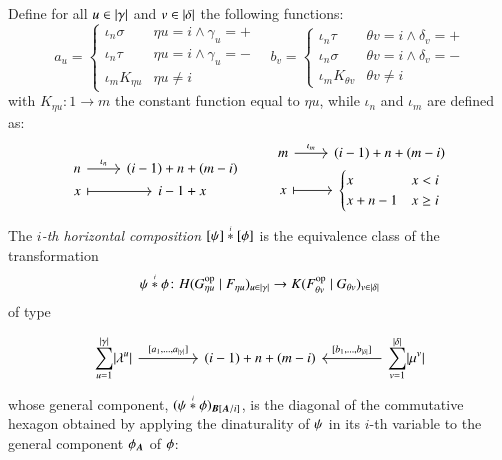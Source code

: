 \begin{definition}
\[	\]
    Define for all $u \in\lvert \gamma \rvert$ and $v\in\lvert \delta \rvert$ the following functions:
    \[
    a_u = \begin{cases}
    \iota_n \sigma & \eta u = i \land \gamma_u=+ \\
    \iota_n \tau & \eta u = i \land \gamma_u = - \\
    \iota_m K_{\eta u} & \eta u \ne i
    \end{cases} \quad
    b_v = \begin{cases}
    \iota_n \tau & \theta v = i \land \delta_v=+ \\
    \iota_n \sigma & \theta v = i \land \delta_v = - \\
    \iota_m K_{\theta v} & \theta v \ne i
    \end{cases}
    \]
     with $K_{\eta u} \colon 1 \to m$ the constant function equal to $\eta u$, while $\iota_n$ and $\iota_m$ are defined as:
    \[
    \begin{tikzcd}[row sep=0em]
    n \ar[r,"\iota_n"] & (i-1)+n+(m-i) \\
    x \ar[|->,r] & i-1+x
    \end{tikzcd}
    \qquad
    \begin{tikzcd}[row sep=0em,ampersand replacement=\&]
    m \ar[r,"\iota_m"] \& (i-1)+n+(m-i) \\
    x \ar[|->,r] \& \begin{cases}
    x & x < i \\
    x +n -1 & x \ge i
    \end{cases}
    \end{tikzcd}
    \]
    The \emph{$i$-th horizontal composition} $\HC {[\fst]} {[\snd]} i$ is the equivalence class of the transformation 
    \[
    \HC \fst \snd i \colon \ghcDom \to \ghcCoDom
    \]	
    of type
    \[
    \begin{tikzcd}[column sep=1.5cm]
    \displaystyle\sum_{u=1}^{\length\gamma} \length{\lambda^u} \ar[r,"{[a_1,\dots, a_{\length\gamma}]}"] & (i-1) + n + (m-i) & \displaystyle\sum_{v=1}^{\length\delta} \length{\mu^v} \ar[l,"{[b_1,\dots, b_{\length\delta}]}"']
    \end{tikzcd}
    \]
    whose general component, $(\HC \fst \snd i)_{\subst B \bfA i}$, is the diagonal of the commutative hexagon obtained by applying the dinaturality of $\psi$ in its $i$-th variable to the general component $\fst_\bfA$ of $\fst$:

\end{definition}
